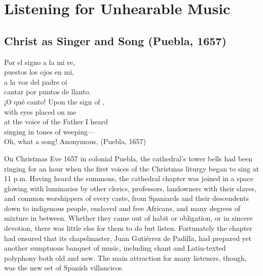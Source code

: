 
% 
% 

\part{Listening for Unhearable Music}
\label{part:unhearable-music}

\chapter{Christ as Singer and Song (Puebla, 1657)}
\label{ch:padilla-voces}

\epigraphTranslation
{Por el signo a la mi re, \\ 
puestos los ojos en mi, \\
a la voz del padre oí \\
cantar por puntos de llanto. \\
¡O qué canto!}
{Upon the sign of , \\
with eyes placed on me  \\
at the voice of the Father I heard \\
singing in tones of weeping--- \\
Oh, what a song!}
{Anonymous,  (Puebla, 1657)}


On Christmas Eve 1657 in colonial Puebla, the cathedral's tower bells had been
ringing for an hour when the first voices of the Christmas liturgy began to sing
at 11 p.m.
Having heard the summons, the cathedral chapter was joined in a space glowing
with luminaries by other clerics, professors, landowners with their slaves, and
common worshippers of every caste, from Spaniards and their descendents down to
indigenous people, enslaved and free Africans, and many degrees of mixture in
between.
Whether they came out of habit or obligation, or in sincere devotion, there was
little else for them to do but listen.
Fortunately the chapter had ensured that its chapelmaster, Juan Gutiérrez de
Padilla, had prepared yet another sumptuous banquet of music, including chant
and Latin-texted polyphony both old and new.
The main attraction for many listeners, though, was the new set of Spanish
villancicos.

